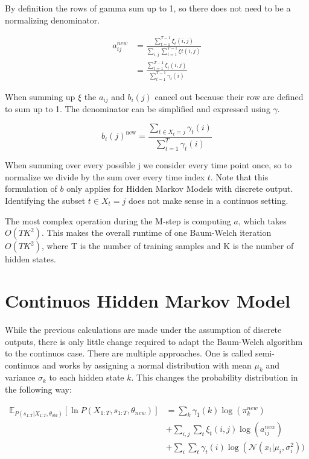 By definition the rows of gamma sum up to 1, so there does not need to be a normalizing denominator.

\begin{equation}
   \begin{aligned}
   a_{i j}^{n e w}&=\frac{\sum_{t=1}^{T-1} \xi_{t}(i, j)}{\sum_{i,j}  \sum_{t=1}^{T-1} \xi{t}(i,j)} \\
   &=\frac{\sum_{t=1}^{T-1} \xi_{t}(i, j)}{\sum_{t=1}^{T-1} \gamma_{t}(i)} 
   \end{aligned}
\end{equation}

When summing up $\xi$ the $a_{ij}$ and $b_i(j)$ cancel out because their row are defined to sum up to 1. The denominator can be simplified and expressed using $\gamma$.

\begin{equation}
   b_{i}(j)^{\text {new}}=\frac{\sum_{t \in X_t = j} \gamma_{t}(i) }{\sum_{t=1}^{T} \gamma_{t}(i)}
\end{equation}

When summing over every possible j we consider every time point once, so to normalize we divide by the sum over every time index $t$. Note that this formulation of $b$ only applies for Hidden Markov Models with discrete output. Identifying the subset $t \in X_t=j$ does not make sense in a continuos setting. 

The most complex operation during the M-step is computing $a$, which takes $O(TK^2)$. This makes the overall runtime of one Baum-Welch iteration $O(TK^2)$, where T is the number of training samples and K is the number of hidden states.

\section{Continuos Hidden Markov Model}

While the previous calculations are made under the assumption of discrete outputs, there is only little change required to adapt the Baum-Welch algorithm to the continuos case. There are multiple approaches. One is called semi-continuos and works by assigning a normal distribution with mean $\mu_k$ and variance $\sigma_k$ to each hidden state $k$. This changes the probability distribution in the following way:


\begin{equation}
\begin{aligned}
\mathbb{E}_{P\left(s_{1: T} | X_{1: T}, \theta_{o l d}\right)}\left[\ln P\left(X_{1: T}, s_{1: T}, \theta_{n e w}\right)\right] &=\sum_{k} \gamma_{1}(k) \log \left(\pi_{k}^{n e w}\right) \\
&+\sum_{i, j} \sum_{t} \xi_{t}(i, j) \log \left(a_{i j}^{n e w}\right) \\
&+\sum_{i} \sum_{t} \gamma_{t}(i)    \log \left(\mathcal{N}\left(x_{t} | \mu_{i}, \sigma_{i}^{2}\right)\right.  )
\end{aligned}
\end{equation}

